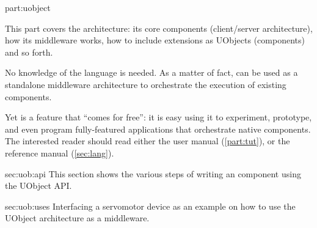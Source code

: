 \begin{partDescription}{part:uobject}
  {
    This part covers the \urbi architecture: its core components
    (client/server architecture), how its middleware works, how to
    include extensions as UObjects (\Cxx components) and so forth.

    No knowledge of the \us language is needed.  As a matter of fact,
    \urbi can be used as a standalone middleware architecture to
    orchestrate the execution of existing components.

    Yet \us is a feature that ``comes for free'': it is easy using it
    to experiment, prototype, and even program fully-featured
    applications that orchestrate native components.  The interested
    reader should read either the \us user manual
    (\autoref{part:tut}), or the reference manual
    (\autoref{sec:lang}).
  }
\item[sec:uob:api] This section shows the various steps of writing an
  \urbi \Cxx component using the UObject API.
\item[sec:uob:uses]
  Interfacing a servomotor device as an example on how to use the
  UObject architecture as a middleware.
\end{partDescription}

